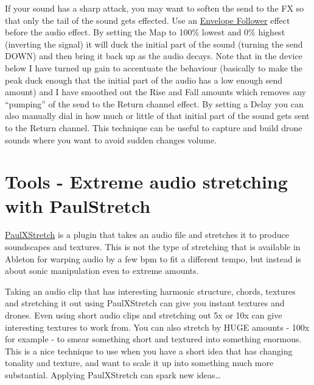 \documentclass[
  12pt,
  letterpaper,
  oneside,
  open=any]{scrbook}
\makeatletter
\newcommand*\pandocbounded[1]{%
  \sbox\pandoc@box{#1}%
  \Gscale@div\@tempa{\textheight}{\dimexpr\ht\pandoc@box+\dp\pandoc@box\relax}%
  \Gscale@div\@tempb{\linewidth}{\wd\pandoc@box}%
  \ifdim\@tempb\p@<\@tempa\p@\let\@tempa\@tempb\fi%
  \ifdim\@tempa\p@<\p@\scalebox{\@tempa}{\usebox\pandoc@box}%
  \else\usebox{\pandoc@box}%
  \fi%
}
\makeatother
\begin{document}
If your sound has a sharp attack, you may want to soften the send to the
FX so that only the tail of the sound gets effected. Use an
\href{https://www.ableton.com/en/live-manual/11/max-for-live-devices/\#envelope-follower}{Envelope
Follower} effect before the audio effect. By setting the Map to 100\%
lowest and 0\% highest (inverting the signal) it will duck the initial
part of the sound (turning the send DOWN) and then bring it back up as
the audio decays. Note that in the device below I have turned up gain to
accentuate the behaviour (basically to make the peak duck enough that
the initial part of the audio has a low enough send amount) and I have
smoothed out the Rise and Fall amounts which removes any ``pumping'' of
the send to the Return channel effect. By setting a Delay you can also
manually dial in how much or little of that initial part of the sound
gets sent to the Return channel. This technique can be useful to capture
and build drone sounds where you want to avoid sudden changes volume.

\pandocbounded{\texttt{[image: images/Envelope\_Follower\_Send.png]}}


\chapter{Tools - Extreme audio stretching with
PaulStretch}\label{Chapter-016-Tools-PaulStretch}

\href{https://sonosaurus.com/paulxstretch/}{PaulXStretch} is a plugin
that takes an audio file and stretches it to produce soundscapes and
textures. This is not the type of stretching that is available in
Ableton for warping audio by a few bpm to fit a different tempo, but
instead is about sonic manipulation even to extreme amounts.

\begin{tcolorbox}[enhanced jigsaw, titlerule=0mm, toprule=.15mm, bottomrule=.15mm, colframe=quarto-callout-tip-color-frame, bottomtitle=1mm, opacityback=0, breakable, leftrule=.75mm, coltitle=black, colback=white, rightrule=.15mm, arc=.35mm, toptitle=1mm, title=\textcolor{quarto-callout-tip-color}{\faLightbulb}\hspace{0.5em}{Key idea}, opacitybacktitle=0.6, left=2mm, colbacktitle=quarto-callout-tip-color!10!white]

Taking an audio clip that has interesting harmonic structure, chords,
textures and stretching it out using PaulXStretch can give you instant
textures and drones. Even using short audio clips and stretching out 5x
or 10x can give interesting textures to work from. You can also stretch
by HUGE amounts - 100x for example - to smear something short and
textured into something enormous. This is a nice technique to use when
you have a short idea that has changing tonality and texture, and want
to scale it up into something much more substantial. Applying
PaulXStretch can spark new ideas\ldots{}

\end{tcolorbox}
\end{document}
